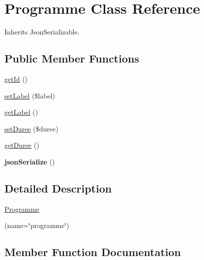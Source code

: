 \hypertarget{class_site_1_1_trail_bundle_1_1_entity_1_1_programme}{}\section{Programme Class Reference}
\label{class_site_1_1_trail_bundle_1_1_entity_1_1_programme}


Inherits Json\+Serializable.

\subsection*{Public Member Functions}
\begin{DoxyCompactItemize}
\item 
\hyperlink{class_site_1_1_trail_bundle_1_1_entity_1_1_programme_a12251d0c022e9e21c137a105ff683f13}{get\+Id} ()
\item 
\hyperlink{class_site_1_1_trail_bundle_1_1_entity_1_1_programme_aff9dc1c7a22e2b4168647651480e586a}{set\+Label} (\$label)
\item 
\hyperlink{class_site_1_1_trail_bundle_1_1_entity_1_1_programme_a14c4e7420d903d3e40342266333d2ecf}{get\+Label} ()
\item 
\hyperlink{class_site_1_1_trail_bundle_1_1_entity_1_1_programme_a20bc9a14168e56c5c54e99fc0085c6a2}{set\+Duree} (\$duree)
\item 
\hyperlink{class_site_1_1_trail_bundle_1_1_entity_1_1_programme_a8738c3c8e09642c9f8f1239e9bfc1c91}{get\+Duree} ()
\item 
\hypertarget{class_site_1_1_trail_bundle_1_1_entity_1_1_programme_ad402d8679325bc514874370f02b5c2ac}{}{\bfseries json\+Serialize} ()\label{class_site_1_1_trail_bundle_1_1_entity_1_1_programme_ad402d8679325bc514874370f02b5c2ac}

\end{DoxyCompactItemize}


\subsection{Detailed Description}
\hyperlink{class_site_1_1_trail_bundle_1_1_entity_1_1_programme}{Programme}

(name=\char`\"{}programme\char`\"{})  

\subsection{Member Function Documentation}
\hypertarget{class_site_1_1_trail_bundle_1_1_entity_1_1_programme_a8738c3c8e09642c9f8f1239e9bfc1c91}{}
